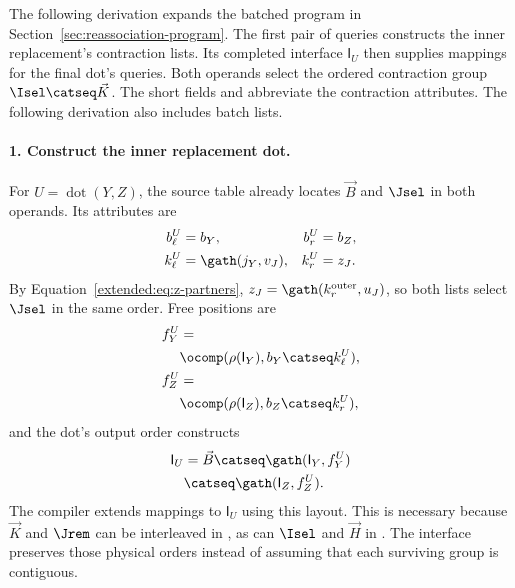 The following derivation expands the batched program in
Section~\ref{sec:reassociation-program}. The first pair of queries constructs
the inner replacement's contraction lists. Its completed interface $\mathsf{I}_U$ then supplies mappings for
the final dot's queries. Both operands select the ordered contraction group
$\Isel\catseq \vec K$.
The short fields  and  abbreviate the
contraction attributes. The following derivation also includes batch lists.


\paragraph{1. Construct the inner replacement dot.}
For $U=\operatorname{dot}(Y,Z)$, the source table already locates $\vec B$ and
$\Jsel$ in both operands. Its attributes are
\begin{equation}
\begin{aligned}
 b_\ell^U&=b_Y,&b_r^U&=b_Z,\\
 k_\ell^U&=\gath(j_Y,v_J),&k_r^U&=z_J.
\end{aligned}
\end{equation}
By Equation~\eqref{extended:eq:z-partners}, $z_J=\gath(k_r^{\mathrm{outer}},u_J)$,
so both lists select $\Jsel$ in the same order. Free positions are
\begin{equation}
\begin{aligned}
 f_Y^U&=\\
 &\ocomp(\rho(\mathsf{I}_Y),b_Y\catseq k_\ell^U),\\
 f_Z^U&=\\
 &\ocomp(\rho(\mathsf{I}_Z),b_Z\catseq k_r^U),
\end{aligned}
\end{equation}
and the dot's output order constructs
\begin{equation}
\begin{aligned}
 \mathsf{I}_U&=\vec B\catseq\gath(\mathsf{I}_Y,f_Y^U)\\
 &\catseq\gath(\mathsf{I}_Z,f_Z^U).
\end{aligned}
 \label{extended:eq:u-interface}
\end{equation}
The compiler extends mappings to $\mathsf{I}_U$ using this layout. This is necessary
because $\vec K$ and $\Jrem$ can be interleaved in , as can $\Isel$ and
$\vec H$ in . The interface preserves those physical orders instead of
assuming that each surviving group is contiguous.



